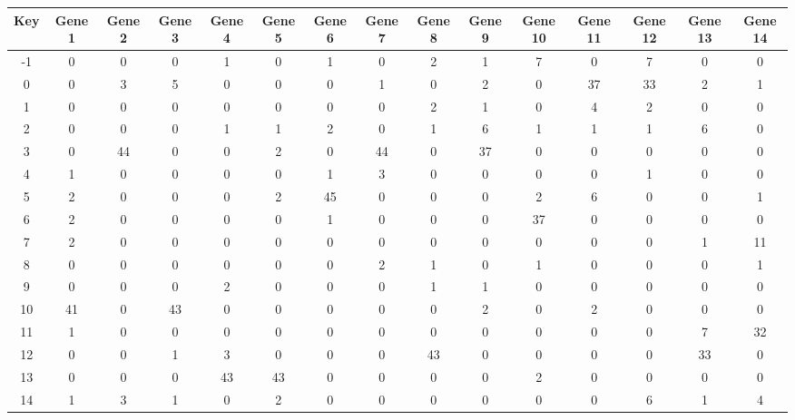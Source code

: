 \begin{tabular}{|c|c|c|c|c|c|c|c|c|c|c|c|c|c|c|}
\hline
Key & Gene 1 & Gene 2 & Gene 3 & Gene 4 & Gene 5 & Gene 6 & Gene 7 & Gene 8 & Gene 9 & Gene 10 & Gene 11 & Gene 12 & Gene 13 & Gene 14 \\
\hline
-1 & 0 & 0 & 0 & 1 & 0 & 1 & 0 & 2 & 1 & 7 & 0 & 7 & 0 & 0 \\
0 & 0 & 3 & 5 & 0 & 0 & 0 & 1 & 0 & 2 & 0 & 37 & 33 & 2 & 1 \\
1 & 0 & 0 & 0 & 0 & 0 & 0 & 0 & 2 & 1 & 0 & 4 & 2 & 0 & 0 \\
2 & 0 & 0 & 0 & 1 & 1 & 2 & 0 & 1 & 6 & 1 & 1 & 1 & 6 & 0 \\
3 & 0 & 44 & 0 & 0 & 2 & 0 & 44 & 0 & 37 & 0 & 0 & 0 & 0 & 0 \\
4 & 1 & 0 & 0 & 0 & 0 & 1 & 3 & 0 & 0 & 0 & 0 & 1 & 0 & 0 \\
5 & 2 & 0 & 0 & 0 & 2 & 45 & 0 & 0 & 0 & 2 & 6 & 0 & 0 & 1 \\
6 & 2 & 0 & 0 & 0 & 0 & 1 & 0 & 0 & 0 & 37 & 0 & 0 & 0 & 0 \\
7 & 2 & 0 & 0 & 0 & 0 & 0 & 0 & 0 & 0 & 0 & 0 & 0 & 1 & 11 \\
8 & 0 & 0 & 0 & 0 & 0 & 0 & 2 & 1 & 0 & 1 & 0 & 0 & 0 & 1 \\
9 & 0 & 0 & 0 & 2 & 0 & 0 & 0 & 1 & 1 & 0 & 0 & 0 & 0 & 0 \\
10 & 41 & 0 & 43 & 0 & 0 & 0 & 0 & 0 & 2 & 0 & 2 & 0 & 0 & 0 \\
11 & 1 & 0 & 0 & 0 & 0 & 0 & 0 & 0 & 0 & 0 & 0 & 0 & 7 & 32 \\
12 & 0 & 0 & 1 & 3 & 0 & 0 & 0 & 43 & 0 & 0 & 0 & 0 & 33 & 0 \\
13 & 0 & 0 & 0 & 43 & 43 & 0 & 0 & 0 & 0 & 2 & 0 & 0 & 0 & 0 \\
14 & 1 & 3 & 1 & 0 & 2 & 0 & 0 & 0 & 0 & 0 & 0 & 6 & 1 & 4 \\
\hline
\end{tabular}